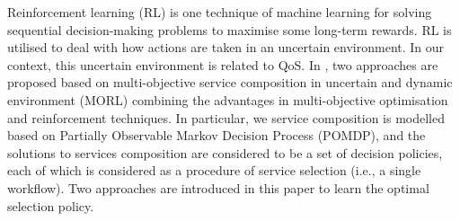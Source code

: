 Reinforcement learning (RL) is one technique of machine learning for solving sequential decision-making problems to maximise some long-term rewards.  RL is utilised to deal with how actions are taken in an uncertain environment. In our context, this uncertain environment is related to QoS. In \cite{mostafa2015multi}, two approaches are proposed based on multi-objective service composition in uncertain and dynamic environment (MORL) combining the advantages in multi-objective optimisation and reinforcement techniques. In particular, we service composition is modelled based on Partially Observable Markov Decision Process (POMDP), and the solutions to services composition are considered to be a set of decision policies, each of which is considered as a procedure of service selection (i.e., a single workflow). Two approaches are introduced in this paper to learn the optimal selection policy. 

